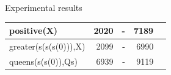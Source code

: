 \documentclass[pdf,slideColor,contemporain]{prosper}
\begin{document}
\begin{slide}{Experimental results}
\begin{tiny}
\begin{table}[t]
\begin{tabular}{||l|r|r|r|r||}
positive(X)                  &  2020      &  -       &  7189   &          \\ 
\hline %
greater(s(s(s(0))),X)        &  2099      &  -       &  6990   &          \\ 
\hline %
queens(s(s(0)),Qs)           &  6939      &  -       &  9119   &          \\ 

\hline %
\hline %

\end{tabular}

\end{table}
 

\end{tiny}

\end{slide}

\end{document}
